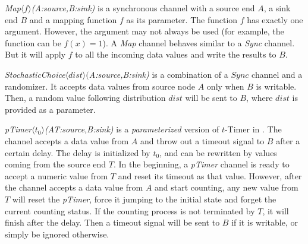 \begin{description}
    \item \emph{Map$\langle f\rangle$(A:source,B:sink)}
        is a synchronous channel with a source end $A$, a sink end $B$ and a mapping function $f$ as its parameter. The function $f$ has exactly one argument. However, the argument may not always be used (for example, the function can be $f(x)=1$).
        A \emph{Map} channel behaves similar to a \emph{Sync} channel. But it will apply $f$ to all the incoming data values and write the results to $B$.
    \item \emph{StochasticChoice$\langle dist\rangle($A:source,B:sink)} is a combination of a $Sync$ channel and a randomizer.
        It accepts data values from source node $A$ only when $B$ is writable. Then, a random value following distribution $dist$ will be sent to $B$, where $dist$ is provided as a parameter.
    \item \emph{pTimer$\langle t_0\rangle$(A\:T:source,B:sink)} is a \emph{parameterized} version of $t$-Timer in \cite{Meng2012}. 
        The channel accepts a data value from $A$ and throw out a timeout signal to $B$ after a certain delay. The delay is initialized by $t_0$, and can be rewritten by values coming from the source end $T$. In the beginning, a \emph{pTimer} channel is ready to accept a numeric value from $T$ and reset its timeout as that value. However, after the channel accepts a data value from $A$ and start counting, any new value from $T$ will reset the \emph{pTimer}, force it jumping to the initial state and forget the current counting status. If the counting process is not terminated by $T$, it will finish after the delay. Then a timeout signal will be sent to $B$ if it is writable, or simply be ignored otherwise.

\end{description}


